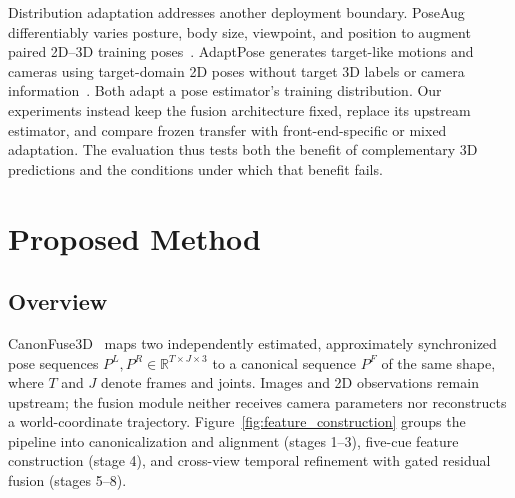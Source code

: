 \documentclass[preprint,12pt]{elsarticle}
\begin{document}
Distribution adaptation addresses another deployment boundary. PoseAug differentiably varies posture, body size, viewpoint, and position to augment paired 2D--3D training poses~\cite{gong2021poseaug}. AdaptPose generates target-like motions and cameras using target-domain 2D poses without target 3D labels or camera information~\cite{gholami2022adaptpose}. Both adapt a pose estimator's training distribution. Our experiments instead keep the fusion architecture fixed, replace its upstream estimator, and compare frozen transfer with front-end-specific or mixed adaptation. The evaluation thus tests both the benefit of complementary 3D predictions and the conditions under which that benefit fails.

\section{Proposed Method}
\label{sec:method}

\subsection{Overview}
\label{subsec:method_overview}

CanonFuse3D~\cite{chen2026canonfuse3dconference} maps two independently estimated, approximately synchronized pose sequences \(P^L,P^R\in\mathbb{R}^{T\times J\times3}\) to a canonical sequence \(P^F\) of the same shape, where \(T\) and \(J\) denote frames and joints. Images and 2D observations remain upstream; the fusion module neither receives camera parameters nor reconstructs a world-coordinate trajectory. Figure~\ref{fig:feature_construction} groups the pipeline into canonicalization and alignment (stages 1--3), five-cue feature construction (stage 4), and cross-view temporal refinement with gated residual fusion (stages 5--8).
\end{document}

